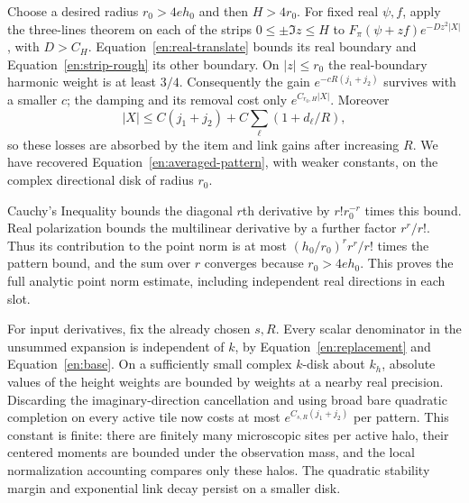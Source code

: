 Choose a desired radius $r_0>4eh_0$ and then $H>4r_0$.
For fixed real $\psi,f$, apply the three-lines theorem on each of the
strips $0\leq\pm\Im z\leq H$ to
$F_\pi(\psi+zf)e^{-D z^2|X|}$, with $D>C_H$.
Equation~\eqref{en:real-translate} bounds its real boundary and
Equation~\eqref{en:strip-rough} its other boundary.  On $|z|\leq r_0$
the real-boundary harmonic weight is at least $3/4$.  Consequently
the gain $e^{-cR(j_1+j_2)}$ survives with a smaller $c$; the damping
and its removal cost only $e^{C_{r_0,H}|X|}$.  Moreover
\begin{equation}\label{en:cover-size}
       |X|\leq C(j_1+j_2)+C\sum_\ell(1+d_\ell/R),
\end{equation}
so these losses are absorbed by the item and link gains after increasing
$R$.  We have recovered Equation~\eqref{en:averaged-pattern}, with
weaker constants, on the complex directional disk of radius $r_0$.

Cauchy's Inequality bounds the diagonal $r$th derivative by
$r!r_0^{-r}$ times this bound.  Real polarization bounds the
multilinear derivative by a further factor $r^r/r!$.  Thus its
contribution to the point norm is at most
$(h_0/r_0)^r r^r/r!$ times the pattern bound, and the sum over $r$
converges because $r_0>4eh_0$.  This proves the full analytic point
norm estimate, including independent real directions in each slot.

For input derivatives, fix the already chosen $s,R$.  Every scalar
denominator in the unsummed expansion is independent of $k$, by
Equation~\eqref{en:replacement} and Equation~\eqref{en:base}.
On a sufficiently small complex $k$-disk about $k_h$, absolute values
of the height weights are bounded by weights at a nearby real
precision.  Discarding the imaginary-direction cancellation and
using broad bare quadratic completion on every active tile now costs
at most $e^{C_{s,R}(j_1+j_2)}$ per pattern.  This constant is finite:
there are finitely many microscopic sites per active halo, their
centered moments are bounded under the observation mass, and the
local normalization accounting compares only these halos.  The
quadratic stability margin and exponential link decay persist on
a smaller disk.

